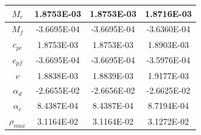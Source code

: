 \begin{table}[!htb]
\begin{tabular}{||c|c|c|c||}
$M_c$        &  1.8753E-03 &  1.8753E-03 &  1.8716E-03 \\ \hline
$M_f$        & -3.6695E-04 & -3.6695E-04 & -3.6360E-04 \\ \hline
$c_{pc}$     &  1.8753E-03 &  1.8753E-03 &  1.8903E-03 \\ \hline
$c_{pf}$     & -3.6695E-04 & -3.6695E-04 & -3.5976E-04 \\ \hline
$v$          &  1.8838E-03 &  1.8839E-03 &  1.9177E-03 \\ \hline
$\alpha_d $  & -2.6655E-02 & -2.6656E-02 & -2.6625E-02 \\ \hline
$\alpha_c$   &  8.4387E-04 &  8.4387E-04 &  8.7194E-04 \\ \hline
$\rho_{max}$ &  3.1164E-02 &  3.1164E-02 &  3.1272E-02 \\ 
\hline \hline
\end{tabular}
\end{table}

